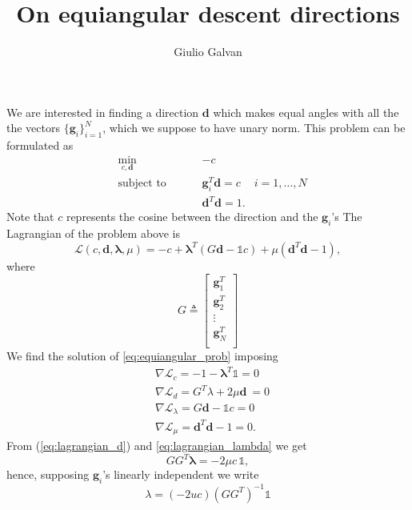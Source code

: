 \documentclass{article}
\title{On equiangular descent directions}
\author{Giulio Galvan}
\renewcommand{\vec}[1]{\boldsymbol{#1}}
\newcommand{\defeq}{\triangleq}
\newcommand{\onevec}{\mathds{1}}
\begin{document}
	\maketitle
	
\noindent
We are interested in finding a direction $\vec{d}$ which makes equal angles with all the the vectors $\{\vec{g}_i\}_{i=1}^N$, which we suppose to have unary norm. This problem can be formulated as
\begin{equation}
\label{eq:equiangular_prob}
\begin{aligned}
& \min_{c,\vec{d}} &&&&-c &\\
& \text{subject to} &&&& \vec{g}_i^T\vec{d} = c & i = 1, \ldots, N\\
& &&&&\vec{d}^T\vec{d} = 1.&
\end{aligned}
\end{equation}
Note that $c$ represents the cosine between the direction and the $\vec{g}_i$'s
The Lagrangian of the problem above is
\begin{equation}
	\mathcal{L}(c,\vec{d},\vec{\lambda},\mu) = -c +\vec{\lambda}^T(G\vec{d}- \onevec c)+ \mu(\vec{d}^T\vec{d}-1),
\end{equation} where
\begin{equation}
G\defeq\begin{bmatrix}
\vec{g}_1^T \\
\vec{g}_2^T \\
\vdots\\
\vec{g}_N^T\\
\end{bmatrix}
\end{equation}
We find the solution of \ref{eq:equiangular_prob} imposing
\begin{align}
\label{eq:lagrangian_c}
&\nabla \mathcal{L}_c = -1 - \vec{\lambda}^T \onevec =0\\
\label{eq:lagrangian_d}
&\nabla \mathcal{L}_d = G^T\lambda + 2\mu\vec{d}\ =0\\
\label{eq:lagrangian_lambda}
&\nabla \mathcal{L}_\lambda = G\vec{d} -\onevec c =0\\
\label{eq:lagrangian_mu}
&\nabla \mathcal{L}_\mu = \vec{d}^T\vec{d}-1 =0.
\end{align}
From (\ref{eq:lagrangian_d}) and \ref{eq:lagrangian_lambda} we get
\begin{equation}
	\label{eq:step1}
	GG^T\vec{\lambda} = -2\mu c\,  \onevec,
\end{equation}hence, supposing $\vec{g}_i$'s linearly independent we write
\begin{equation}
\label{eq:step2}
	\lambda = (-2uc)(GG^T)^{-1} \onevec
\end{equation}
\end{document}
